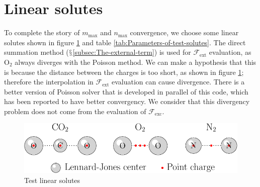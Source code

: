 \section{Linear solutes}

To complete the story of $m_{\max}$ and $n_{\max}$ convergence,
we choose some linear solutes shown in figure \ref{fig:Test-linear-solutes}
and table \ref{tab:Parameters-of-test-solutes}. The direct summation
method ($\mathsection$\ref{subsec:The-external-term}) is used for
$\mathcal{F}_{\mathrm{ext}}$ evaluation, as $\mathrm{O}_{2}$ always
diverges with the Poisson method. We can make a hypothesis that this is
because the distance between the charges is too short, as shown in
figure \ref{fig:Test-linear-solutes}; therefore the interpolation
in $\mathcal{F}_{\mathrm{ext}}$ evaluation can cause divergence.
There is a better version of Poisson solver that is developed in parallel
of this code, which has been reported to have better convergency.
We consider that this divergency problem does not come from the evaluation
of $\mathcal{F}_{\mathrm{exc}}$.

\begin{figure}[h]
\begin{centering}
\includegraphics[scale=0.6]{_figure/app_solute}
\par\end{centering}
\caption{Test linear solutes\label{fig:Test-linear-solutes}}
\end{figure}

